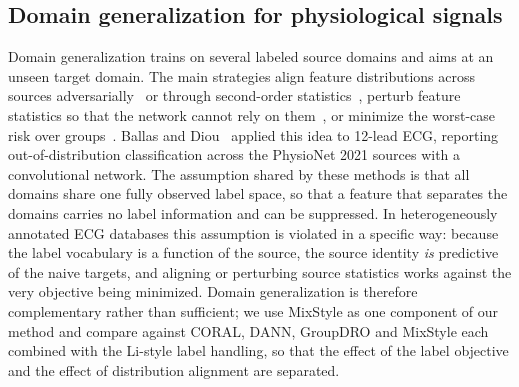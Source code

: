 \subsection{Domain generalization for physiological signals}\label{sec:rel_dg}
Domain generalization trains on several labeled source domains and aims at an unseen target domain. The main strategies align feature distributions across sources adversarially~\cite{ganin2016} or through second-order statistics~\cite{sun2016coral}, perturb feature statistics so that the network cannot rely on them~\cite{zhou2021mixstyle}, or minimize the worst-case risk over groups~\cite{sagawa2020}. Ballas and Diou~\cite{ballas2022} applied this idea to 12-lead ECG, reporting out-of-distribution classification across the PhysioNet 2021 sources with a convolutional network. The assumption shared by these methods is that all domains share one fully observed label space, so that a feature that separates the domains carries no label information and can be suppressed. In heterogeneously annotated ECG databases this assumption is violated in a specific way: because the label vocabulary is a function of the source, the source identity \emph{is} predictive of the naive targets, and aligning or perturbing source statistics works against the very objective being minimized. Domain generalization is therefore complementary rather than sufficient; we use MixStyle as one component of our method and compare against CORAL, DANN, GroupDRO and MixStyle each combined with the Li-style label handling, so that the effect of the label objective and the effect of distribution alignment are separated.

